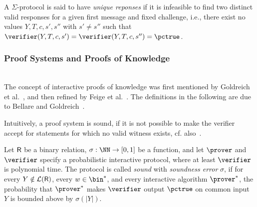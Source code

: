 \documentclass[runningheads]{llncs}
\begin{document}
A $\Sigma$-protocol is said to have \emph{unique reponses} if it is infeasible to find two distinct valid responses for a given first message and fixed challenge, i.e., there exist no values $Y,T,c,s',s''$ with $s'\ne s''$ such that $\verifier(Y,T,c,s')=\verifier(Y,T,c,s'')=\accept$.

\subsubsection{Proof Systems and Proofs of Knowledge}~\\

The concept of interactive proofs of knowledge was first mentioned by Goldreich et al.~\cite{STOC:GolMicRac85}, and then refined by Feige et al.~\cite{STOC:FeiFiaSha87}.
The definitions in the following are due to Bellare and Goldreich~\cite{C:BelGol92}.

Intuitively, a proof system is sound, if it is not possible to make the verifier accept for statements for which no valid witness exists, cf. also~\cite[1.6.2]{zkproof-reference}.
\begin{definition}\label{def:soundness}
  Let $\mathsf{R}$ be a binary relation, $\sigma:\NN\to[0,1]$ be a function, and let $\prover$ and $\verifier$ specify a probabilistic interactive protocol, where at least $\verifier$ is polynomial time.
  The protocol is called \emph{sound} with \emph{soundness error} $\sigma$, if for every $Y\notin\mathcal{L}(\mathsf{R})$, every $w\in\bin^*$, and every interactive algorithm $\prover^*$, the probability that $\prover^*$ makes $\verifier$ output $\accept$ on common input $Y$ is bounded above by $\sigma(|Y|)$.
\end{definition}
\end{document}

